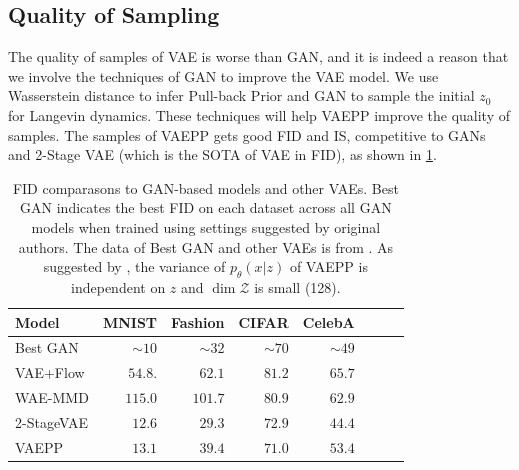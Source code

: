 \subsection{Quality of Sampling}
The quality of samples of VAE is worse than GAN, and it is indeed a reason that we involve the techniques of GAN to improve the VAE model. We use  Wasserstein distance to infer Pull-back Prior and GAN to sample the initial $z_0$ for Langevin dynamics. These techniques will help VAEPP improve the quality of samples. The samples of VAEPP gets good FID and IS, competitive to GANs and 2-Stage VAE (which is the SOTA of VAE in FID), as shown in \cref{tab:compare_FID}. 
\begin{table}[tb]
\centering
\begin{tabular}{lrrrrrrr}  
\toprule
Model & MNIST & Fashion & CIFAR & CelebA\\
\midrule
Best GAN   & $\sim10$& $\sim32$&$\sim70$& $\sim49$\\
VAE+Flow   & $54.8$. & $62.1$  & $81.2$ & $65.7$\\
WAE-MMD    & $115.0$ & $101.7$ & $80.9$ & $62.9$\\
2-StageVAE & $12.6$  & $29.3$  & $72.9$ & $44.4$\\
VAEPP      & $13.1$  & $39.4$  & $71.0$ & $53.4$ \\
\bottomrule
\end{tabular} 
\caption{FID comparasons to GAN-based models and other VAEs. Best GAN indicates the best FID on each dataset across all GAN models when trained using settings suggested by original authors. The data of Best GAN and other VAEs is from \protect\cite{dai2019diagnosing}. As suggested by \protect\cite{dai2019diagnosing}, the variance of $p_\theta(x|z)$ of VAEPP is independent on $z$ and $\dim \mathcal{Z}$ is small (128). }
\label{tab:compare_FID}
\end{table}
